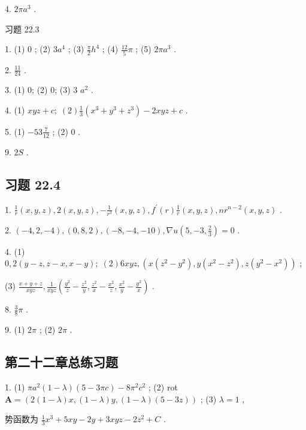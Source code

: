 4. \({2\pi }{a}^{3}\) .

习题 22.3

1. (1) 0 ; (2) \(3{a}^{4}\) ; (3) \(\frac{\pi }{2}{h}^{4}\) ; (4) \(\frac{12}{5}\pi\) ; (5) \({2\pi }{a}^{3}\) .

2. \(\frac{11}{24}\) .

3. (1) 0; (2) 0; (3) 3 \({a}^{2}\) .

4. (1) \({xyz} + c;\;\left( 2\right) \frac{1}{3}\left( {{x}^{3} + {y}^{3} + {z}^{3}}\right)  - {2xyz} + c\) .

5. (1) \(- {53}\frac{7}{12}\) ; (2) 0 .

9. \({2S}\) .

\subsection{习题 22.4}

1. \(\frac{1}{r}\left( {x,y,z}\right) ,2\left( {x,y,z}\right) , - \frac{1}{{r}^{3}}\left( {x,y,z}\right) ,{f}^{\prime }\left( r\right) \frac{1}{r}\left( {x,y,z}\right) ,n{r}^{n - 2}\left( {x,y,z}\right)\) .

2. \(\left( {-4,2, - 4}\right) ,\left( {0,8,2}\right) ,\left( {-8, - 4, - {10}}\right) ,\nabla u\left( {5, - 3,\frac{2}{3}}\right)  = 0\) .

4. (1) \(0,2\left( {y - z,z - x,x - y}\right) ;\;\left( 2\right) {6xyz},\left( {x\left( {{z}^{2} - {y}^{2}}\right) ,y\left( {{x}^{2} - {z}^{2}}\right) ,z\left( {{y}^{2} - {x}^{2}}\right) }\right)\) ;

(3) \(\frac{x + y + z}{xyz},\frac{1}{xyz}\left( {\frac{{y}^{2}}{z} - \frac{{z}^{2}}{y},\frac{{z}^{2}}{x} - \frac{{x}^{2}}{z},\frac{{x}^{2}}{y} - \frac{{y}^{2}}{x}}\right)\) .

8. \(\frac{3}{8}\pi\) .

9. (1) \({2\pi }\) ; (2) \({2\pi }\) .

\subsection{第二十二章总练习题}

1. (1) \(\pi {a}^{2}\left( {1 - \lambda }\right) \left( {5 - {3\pi c}}\right)  - 8{\pi }^{2}{c}^{2}\) ; (2) rot \(\mathbf{A} = \left( {2\left( {1 - \lambda }\right) x,\left( {1 - \lambda }\right) y,\left( {1 - \lambda }\right) \left( {5 - {3z}}\right) }\right)\) ; (3) \(\lambda  = 1\) ,

势函数为 \(\frac{1}{3}{x}^{3} + {5xy} - {2y} + {3xyz} - 2{z}^{2} + C\) .

